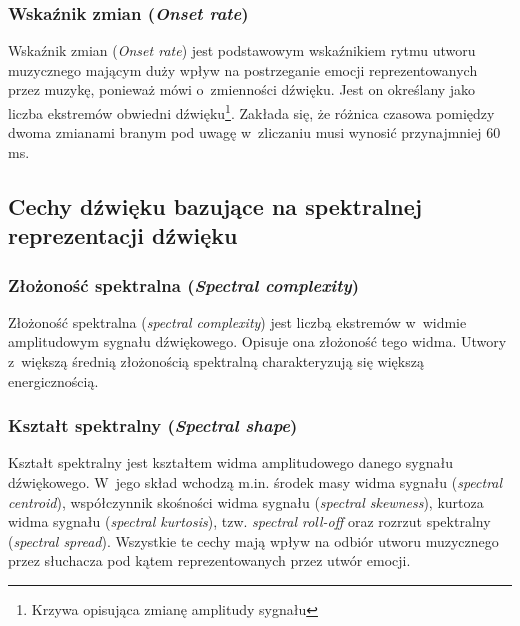 \subsubsection{Wskaźnik zmian (\emph{Onset rate})}
Wskaźnik zmian (\emph{Onset rate}) jest podstawowym wskaźnikiem rytmu utworu muzycznego mającym duży wpływ na postrzeganie emocji reprezentowanych przez muzykę, ponieważ mówi o~zmienności dźwięku. Jest on określany jako liczba ekstremów obwiedni dźwięku\footnote{Krzywa opisująca zmianę amplitudy
sygnału\cite{obwiednia}}. Zakłada się, że różnica czasowa pomiędzy dwoma zmianami branym pod uwagę w~zliczaniu musi wynosić przynajmniej 60 ms\cite{phdWork}. 
 
\subsection{Cechy dźwięku bazujące na spektralnej reprezentacji dźwięku}
\subsubsection{Złożoność spektralna (\emph{Spectral complexity})}
Złożoność spektralna (\emph{spectral complexity}) jest liczbą ekstremów w~widmie amplitudowym sygnału dźwiękowego. Opisuje ona złożoność tego widma. Utwory z~większą średnią złożonością spektralną charakteryzują się większą energicznością\cite{phdWork}.

\subsubsection{Kształt spektralny (\emph{Spectral shape})}
Kształt spektralny jest kształtem widma amplitudowego danego sygnału dźwiękowego. W~jego skład wchodzą m.in. środek masy widma sygnału (\emph{spectral centroid}), współczynnik skośności widma sygnału (\emph{spectral skewness}), kurtoza widma sygnału (\emph{spectral kurtosis}), tzw. \emph{spectral roll-off} oraz rozrzut spektralny (\emph{spectral spread}). Wszystkie te cechy mają wpływ na odbiór utworu muzycznego przez słuchacza pod kątem reprezentowanych przez utwór emocji\cite{phdWork}.


